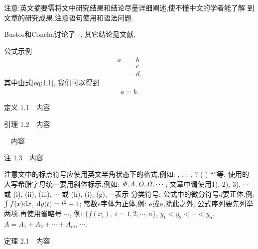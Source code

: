 \documentclass{jssms}
\numberwithin{equation}{section}
\def\dd{{\rm d}}
\def\ee{{\rm e}}
\begin{document}

注意:英文摘要需将文中研究结果和结论尽量详细阐述,使不懂中文的学者能了解
到文章的研究成果.注意语句使用和语法问题.



\EndTitle




Bustos和Concha\supercite{ref1}讨论了$\cdots$,
其它结论见文献\cite{ref2,ref3,ref4},


公式示例\supercite{ref2,ref3,ref5,ref6,ref7}
\begin{align}\label{eq:1.1}
a&=b \nonumber\\
&=c\nonumber\\
&=d.
\end{align}
其中由式\eqref{eq:1.1}, %
我们可以得到
\begin{align*}
a=b.
\end{align*}

{\HT 定义 1.1}\ \   内容

{\HT 引理 1.2}\ \   内容

\ \   内容

{\KS 注 1.3}\ \   内容



注意文中的标点符号应使用英文半角状态下的格式,例如: , . : ; ? ( )
``''等; 使用的大写希腊字母统一要用斜体标示,例如: ${\it \Phi},{\it
\Lambda},
 {\it \Theta},{\it\Omega},\cdots$; 文章中请使用1), 2), 3),
 $\cdots$或 (i), (ii), (iii), $\cdots$ 或 (h), (i), (g), $\cdots$表示
 分类符号; 公式中的微分符号$d$要正体,例: $\int f(x)\dd x$,
  $\dd y(t)=t^2+1$; 常数$e$字体为正体,例: ${\rm e}$或$\ee$,除此之外,
公式序列要先列举两项,再使用省略号 $\cdots$,
 例: $\{f(x_i),\ i=1,2,\cdots,n\}$, $y_1<y_2<\cdots<y_n$,
$A=A_1+A_2+\cdots+A_m$,  $ \cdots$.

\setcounter{section}{2}\setcounter{equation}{0}

{\HT 定理 2.1}\ \   内容
\end{document}
